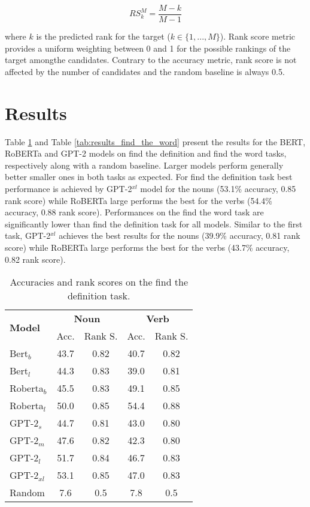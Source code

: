 \documentclass[11pt,a4paper]{article}
\begin{document}
\begin{equation*}
    RS^M_k = \frac{M-k}{M-1}
\end{equation*}

\noindent where $k$ is the predicted rank for the target ($k \in \{1,...,M\}$). Rank score metric provides a uniform weighting between 0 and 1 for the possible rankings of the target amongthe candidates. Contrary to the accuracy metric, rank score is not affected by the number of candidates and the random baseline is always 0.5.  

\section{Results}

Table \ref{tab:results_find_the_definition} and Table \ref{tab:results_find_the_word} present the results for the BERT, RoBERTa and GPT-2 models on find the definition and find the word tasks, respectively along with a random baseline. Larger models perform generally better smaller ones in both tasks as expected. For find the definition task best performance is achieved by GPT-2$^{xl}$ model for the nouns (53.1\% accuracy, 0.85 rank score) while RoBERTa large performs the best for the verbs (54.4\% accuracy, 0.88 rank score). Performances on the find the word task are significantly lower than find the definition task for all models. Similar to the first task, GPT-2$^{xl}$ achieves the best results for the nouns (39.9\% accuracy, 0.81 rank score) while RoBERTa large performs the best for the verbs (43.7\% accuracy, 0.82 rank score).

\begin{table}
    \centering
    \begin{tabular}{l|cccc}
        \hline
         \multirow{2}{*}{\textbf{Model}} & \multicolumn{2}{c}{\textbf{Noun}} & \multicolumn{2}{c}{\textbf{Verb}} \\
         & Acc. & Rank S. & Acc. & Rank S. \\ \hline
     Bert$_{b}$ & 43.7 & 0.82 & 40.7 & 0.82 \\
     Bert$_{l}$ & 44.3 & 0.83 & 39.0 & 0.81 \\
     Roberta$_{b}$ & 45.5 & 0.83 & 49.1 & 0.85 \\
     Roberta$_{l}$ & 50.0 & 0.85 & 54.4 & 0.88 \\ \hline
     GPT-2$_{s}$ & 44.7 & 0.81 & 43.0 & 0.80 \\
     GPT-2$_{m}$ & 47.6 & 0.82 & 42.3 & 0.80 \\
     GPT-2$_{l}$ & 51.7 & 0.84 & 46.7 & 0.83 \\
     GPT-2$_{xl}$ & 53.1 & 0.85 & 47.0 & 0.83 \\ \hline 
     Random & 7.6 & 0.5 & 7.8 & 0.5 \\\hline
     
    \end{tabular}
    \caption{Accuracies and rank scores on the find the definition task.}
    \label{tab:results_find_the_definition}
\end{table}
\end{document}
